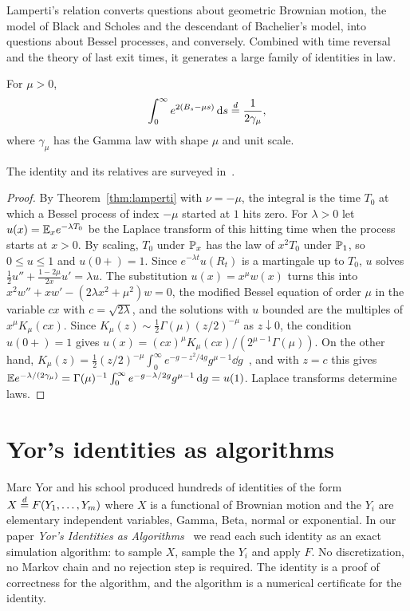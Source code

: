 Lamperti's relation converts questions about geometric Brownian motion, the model of Black and Scholes and the descendant of Bachelier's model, into questions about Bessel processes, and conversely. Combined with time reversal and the theory of last exit times, it generates a large family of identities in law.

\begin{theorem}
\label{thm:dufresne}
For $\mu>0$,
\[
\int_0^\infty e^{2(B_s - \mu s)}\dd s \eqd \frac{1}{2\gamma_\mu},
\]
where $\gamma_\mu$ has the Gamma law with shape $\mu$ and unit scale.
\end{theorem}

The identity and its relatives are surveyed in~\cite{matsumotoyor2005}.

\begin{proof}
By Theorem~\ref{thm:lamperti} with $\nu=-\mu$, the integral is the time $T_0$ at which a Bessel process of index $-\mu$ started at $1$ hits zero. For $\lambda>0$ let $u(x) = \E_xe^{-\lambda T_0}$ be the Laplace transform of this hitting time when the process starts at $x>0$. By scaling, $T_0$ under $\P_x$ has the law of $x^2T_0$ under $\P_1$, so $0\leq u\leq1$ and $u(0+)=1$. Since $e^{-\lambda t}u(R_t)$ is a martingale up to $T_0$, $u$ solves $\frac12u''+\frac{1-2\mu}{2x}u' = \lambda u$. The substitution $u(x) = x^\mu w(x)$ turns this into $x^2w''+xw'-(2\lambda x^2+\mu^2)w=0$, the modified Bessel equation of order $\mu$ in the variable $cx$ with $c = \sqrt{2\lambda}$, and the solutions with $u$ bounded are the multiples of $x^\mu K_\mu(cx)$. Since $K_\mu(z)\sim\frac12\Gamma(\mu)(z/2)^{-\mu}$ as $z\downarrow0$, the condition $u(0+)=1$ gives $u(x) = (cx)^\mu K_\mu(cx)/(2^{\mu-1}\Gamma(\mu))$. On the other hand, $K_\mu(z) = \frac12(z/2)^{-\mu}\int_0^\infty e^{-g-z^2/4g}g^{\mu-1}\dd g$~\cite[10.32.10]{dlmf}, and with $z=c$ this gives $\E e^{-\lambda/(2\gamma_\mu)} = \Gamma(\mu)^{-1}\int_0^\infty e^{-g-\lambda/2g}g^{\mu-1}\dd g = u(1)$. Laplace transforms determine laws.
\end{proof}

\section{Yor's identities as algorithms}

Marc Yor and his school produced hundreds of identities of the form $X\eqd F(Y_1,\dots,Y_m)$ where $X$ is a functional of Brownian motion and the $Y_i$ are elementary independent variables, Gamma, Beta, normal or exponential. In our paper \emph{Yor's Identities as Algorithms}~\cite{polsonsokolovyor} we read each such identity as an exact simulation algorithm: to sample $X$, sample the $Y_i$ and apply $F$. No discretization, no Markov chain and no rejection step is required. The identity is a proof of correctness for the algorithm, and the algorithm is a numerical certificate for the identity.

